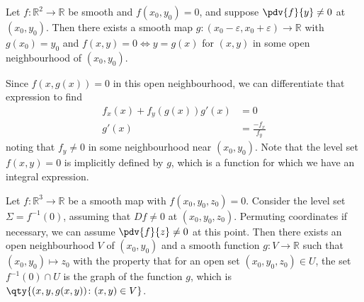 \begin{example}
	Let $f \colon \mathbb R^2 \to \mathbb R$ be smooth and $f(x_0, y_0) = 0$, and suppose $\pdv{f}{y} \neq 0$ at $(x_0, y_0)$.
	Then there exists a smooth map $g \colon (x_0 - \varepsilon, x_0 + \varepsilon) \to \mathbb R$ with $g(x_0) = y_0$ and $f(x,y) = 0 \iff y = g(x)$ for $(x,y)$ in some open neighbourhood of $(x_0, y_0)$.

	Since $f(x,g(x)) = 0$ in this open neighbourhood, we can differentiate that expression to find
	\begin{align*}
		f_x(x) + f_y(g(x)) g'(x) &= 0 \\
		g'(x) &= \frac{-f_x}{f_y}
	\end{align*}
	noting that $f_y \neq 0$ in some neighbourhood near $(x_0, y_0)$.
	Note that the level set $f(x,y) = 0$ is implicitly defined by $g$, which is a function for which we have an integral expression.
\end{example}

\begin{example} \label{exm:2}
	Let $f \colon \mathbb R^3 \to \mathbb R$ be a smooth map with $f(x_0, y_0, z_0) = 0$.
	Consider the level set $\Sigma = f^{-1}(0)$, assuming that $Df \neq 0$ at $(x_0, y_0, z_0)$.
	Permuting coordinates if necessary, we can assume $\pdv{f}{z} \neq 0$ at this point.
	Then there exists an open neighbourhood $V$ of $(x_0, y_0)$ and a smooth function $g \colon V \to \mathbb R$ such that $(x_0, y_0) \mapsto z_0$ with the property that for an open set $(x_0, y_0, z_0) \in U$, the set $f^{-1}(0) \cap U$ is the graph of the function $g$, which is $\qty{ (x,y,g(x,y)) \colon (x,y) \in V }$.
\end{example}

